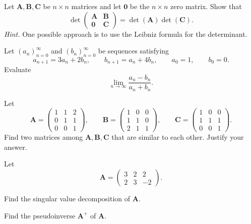 \begin{problem}
Let $\mathbf A,\mathbf B,\mathbf C$ be $n\times n$ matrices and let $\mathbf 0$ be the $n\times n$ zero matrix. Show that
\[
\det
\begin{pmatrix}
\mathbf A&\mathbf B\\
\mathbf 0&\mathbf C
\end{pmatrix}
=\det(\mathbf A)\det(\mathbf C).
\]
\textit{Hint.} One possible approach is to use the Leibniz formula for the determinant.
\end{problem}

\begin{problem}
Let $(a_n)_{n=0}^{\infty}$ and $(b_n)_{n=0}^{\infty}$ be sequences satisfying
\[
a_{n+1}=3a_n+2b_n,
\qquad
b_{n+1}=a_n+4b_n,
\qquad
a_0=1,
\qquad
b_0=0.
\]
Evaluate
\[
\lim_{n\to\infty}\frac{a_n-b_n}{a_n+b_n}.
\]
\end{problem}

\begin{problem}
Let
\[
\mathbf A=
\begin{pmatrix}
1&1&2\\
0&1&1\\
0&0&1
\end{pmatrix},
\qquad
\mathbf B=
\begin{pmatrix}
1&0&0\\
1&1&0\\
2&1&1
\end{pmatrix},
\qquad
\mathbf C=
\begin{pmatrix}
1&0&0\\
1&1&1\\
0&0&1
\end{pmatrix}.
\]
Find two matrices among $\mathbf A,\mathbf B,\mathbf C$ that are similar to each other. Justify your answer.
\end{problem}

\begin{problem}
Let
\[
\mathbf A=
\begin{pmatrix}
3&2&2\\
2&3&-2
\end{pmatrix}.
\]
\begin{problemsubparts}
\item Find the singular value decomposition of $\mathbf A$.
\item Find the pseudoinverse $\mathbf A^+$ of $\mathbf A$.
\end{problemsubparts}
\end{problem}

